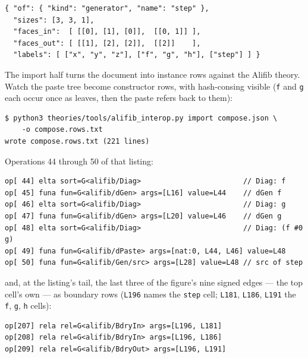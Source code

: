 \begin{Verbatim}[fontsize=\small,frame=leftline,rulecolor=\color{accentmid},framesep=3mm,xleftmargin=3mm]
{ "of": { "kind": "generator", "name": "step" },
  "sizes": [3, 3, 1],
  "faces_in":  [ [[0], [1], [0]],  [[0, 1]] ],
  "faces_out": [ [[1], [2], [2]],  [[2]]    ],
  "labels": [ ["x", "y", "z"], ["f", "g", "h"], ["step"] ] }
\end{Verbatim}

The import half turns the document into instance rows against the
Alifib theory. Watch the paste tree become constructor rows, with
hash-consing visible (\texttt{f} and \texttt{g} each occur once as
leaves, then the paste refers back to them):

\begin{Verbatim}[fontsize=\small,frame=leftline,rulecolor=\color{accentmid},framesep=3mm,xleftmargin=3mm]
$ python3 theories/tools/alifib_interop.py import compose.json \
    -o compose.rows.txt
wrote compose.rows.txt (221 lines)
\end{Verbatim}

\noindent Operations 44 through 50 of that listing:

\begin{Verbatim}[fontsize=\small,frame=leftline,rulecolor=\color{accentmid},framesep=3mm,xleftmargin=3mm]
op[ 44] elta sort=G<alifib/Diag>                        // Diag: f
op[ 45] funa fun=G<alifib/dGen> args=[L16] value=L44    // dGen f
op[ 46] elta sort=G<alifib/Diag>                        // Diag: g
op[ 47] funa fun=G<alifib/dGen> args=[L20] value=L46    // dGen g
op[ 48] elta sort=G<alifib/Diag>                        // Diag: (f #0 g)
op[ 49] funa fun=G<alifib/dPaste> args=[nat:0, L44, L46] value=L48
op[ 50] funa fun=G<alifib/Gen/src> args=[L28] value=L48 // src of step
\end{Verbatim}

\noindent and, at the listing's tail, the last three of the figure's
nine signed edges --- the top cell's own --- as boundary rows
(\texttt{L196} names the \texttt{step} cell; \texttt{L181},
\texttt{L186}, \texttt{L191} the \texttt{f}, \texttt{g}, \texttt{h}
cells):

\begin{Verbatim}[fontsize=\small,frame=leftline,rulecolor=\color{accentmid},framesep=3mm,xleftmargin=3mm]
op[207] rela rel=G<alifib/BdryIn> args=[L196, L181]
op[208] rela rel=G<alifib/BdryIn> args=[L196, L186]
op[209] rela rel=G<alifib/BdryOut> args=[L196, L191]
\end{Verbatim}

